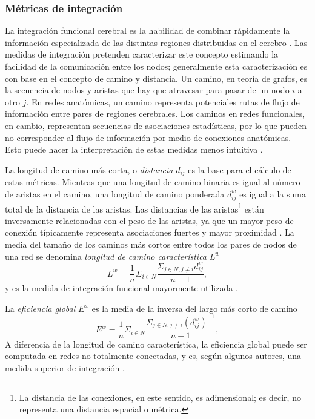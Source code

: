 \subsubsection{Métricas de integración}
La integración funcional cerebral es la habilidad de combinar rápidamente la información especializada de las distintas regiones distribuidas en el cerebro \parencite{Tononi1994}.
Las medidas de integración pretenden caracterizar este concepto estimando la facilidad de la comunicación entre los nodos; generalmente esta caracterización es con base en el concepto de camino y distancia.
Un camino, en teoría de grafos, es la secuencia de nodos y aristas que hay que atravesar para pasar de un nodo $i$ a otro $j$.
En redes anatómicas, un camino representa potenciales rutas de flujo de información entre pares de regiones cerebrales.
Los caminos en redes funcionales, en cambio, representan secuencias de asociaciones estadísticas, por lo que pueden no corresponder al flujo de información por medio de conexiones anatómicas. Esto puede hacer la interpretación de estas medidas menos intuitiva \parencite{Rubinov2010}. \par
La longitud de camino más corta, o \emph{distancia} $d_{ij}$ es la base para el cálculo de estas métricas.
Mientras que una longitud de camino binaria es igual al número de aristas en el camino, una longitud de camino ponderada $d_{ij}^w$ es igual a la suma total de la distancia de las aristas.
Las distancias de las aristas\footnote{La distancia de las conexiones, en este sentido, es adimensional; es decir, no representa una distancia espacial o métrica.} están inversamente relacionadas con el peso de las aristas, ya que un mayor peso de conexión típicamente representa asociaciones fuertes y mayor proximidad \parencite{Rubinov2010}.
La media del tamaño de los caminos más cortos entre todos los pares de nodos de una red se denomina \emph{longitud de camino característica} $L^w$ \parencite{Watts1998}
\begin{equation}\label{eqCPL}
    L^w=\frac{1}{n}\Sigma_{i \in N}\frac{\Sigma_{j \in N,j\neq i}d_{ij}^w}{n-1},
\end{equation}
y es la medida de integración funcional mayormente utilizada \parencite{Rubinov2010}.\par
La \emph{eficiencia global} $E^w$ \parencite{Latora2001} es la media de la inversa del largo más corto de camino
\begin{equation}\label{eqEglob}
    E^w=\frac{1}{n}\Sigma_{i \in N}\frac{\Sigma_{j \in N, j \neq i}(d_{ij}^w)^{-1}}{n-1},
\end{equation}
A diferencia de la longitud de camino característica, la eficiencia global puede ser computada en redes no totalmente conectadas, y es, según algunos autores, una medida superior de integración \parencite{Achard2007}.

